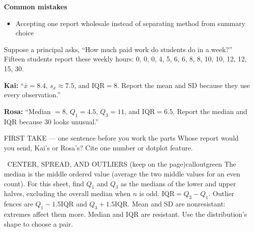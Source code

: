 \documentclass[11pt]{article}
\begin{document}
\textbf{Common mistakes}
\begin{itemize}[leftmargin=1.5em,itemsep=2pt,topsep=2pt]
  \item Accepting one report wholesale instead of separating method from summary choice
\end{itemize}

\clearpage
{}

Suppose a principal asks, ``How much paid work do students do in a week?'' Fifteen students report these weekly hours: 0, 0, 0, 4, 5, 6, 6, 8, 8, 10, 10, 12, 12, 15, 30.\par\smallskip \textbf{Kai:} ``$\bar{x}=8.4$, $s_x\approx7.5$, and $\mathrm{IQR}=8$. Report the mean and SD because they use every observation.''\par \textbf{Rosa:} ``Median $=8$, $Q_1=4.5$, $Q_3=11$, and $\mathrm{IQR}=6.5$. Report the median and IQR because 30 looks unusual.''\par
\begin{center}
\end{center}
\begin{firsttakebox}{FIRST TAKE --- one sentence before you work the parts}
Whose report would you send, Kai's or Rosa's? Cite one number or dotplot feature.\par
{}
\end{firsttakebox}

\begin{callout}{\IconBook\ CENTER, SPREAD, AND OUTLIERS (keep on the page)}{calloutgreen}
The median is the middle ordered value (average the two middle values for an even count). For this sheet, find $Q_1$ and $Q_3$ as the medians of the lower and upper halves, excluding the overall median when $n$ is odd. $\mathrm{IQR}=Q_3-Q_1$. Outlier fences are $Q_1-1.5\mathrm{IQR}$ and $Q_3+1.5\mathrm{IQR}$. Mean and SD are nonresistant: extremes affect them more. Median and IQR are resistant. Use the distribution's shape to choose a pair.
\end{callout}
\end{document}
